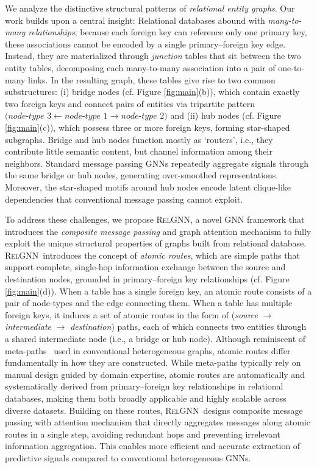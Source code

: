 \documentclass{article}
\newcommand{\method}{\textsc{RelGNN}}
\theoremstyle{plain}
\theoremstyle{definition}
\theoremstyle{remark}
\begin{document}
\vspace{-9pt}
 We analyze the distinctive structural patterns of \emph{relational entity graphs}. Our work builds upon a central insight: Relational databases abound with \textit{many-to-many relationships}; because each foreign key can reference only one primary key, these associations cannot be encoded by a single primary–foreign key edge. Instead, they are materialized through \emph{junction} tables that sit between the two entity tables, decomposing each many-to-many association into a pair of one-to-many links. In the resulting graph, these tables give rise to two common substructures: (i) bridge nodes (cf. Figure \ref{fig:main}(b)), which contain exactly two foreign keys and connect pairs of entities via tripartite pattern \(\textit{(node-type 3} \leftarrow \textit{node-type 1} \rightarrow \textit{node-type 2)}\) and (ii) hub nodes (cf. Figure \ref{fig:main}(c)), which possess three or more foreign keys, forming star-shaped subgraphs. Bridge and hub nodes function mostly as `routers', i.e., they contribute little semantic content, but channel information among their neighbors. Standard message passing GNNs repeatedly aggregate signals through the same bridge or hub nodes, generating over-smoothed representations. Moreover, the star-shaped motifs around hub nodes encode latent clique-like dependencies that conventional message passing cannot exploit.

To address these challenges, we propose \method, a novel GNN framework that introduces the \textit{composite message passing} and {graph attention mechanism} to fully exploit the unique structural properties of graphs built from relational database. \method~introduces the concept of \textit{atomic routes}, which are simple paths that support complete, single-hop information exchange between the source and destination nodes, grounded in primary–foreign key relationships (cf. Figure \ref{fig:main}(d)). When a table has a single foreign key, an atomic route consists of a pair of node-types and the edge connecting them. When a table has multiple foreign keys, it induces a set of atomic routes in the form of (\textit{source} $\rightarrow$ \textit{intermediate} $\rightarrow$ \textit{destination}) paths, each of which connects two entities through a shared intermediate node (i.e., a bridge or hub node). Although reminiscent of meta-paths~\citep{sun2011pathsim} used in conventional heterogeneous graphs, atomic routes differ fundamentally in how they are constructed. While meta-paths typically rely on manual design guided by domain expertise, atomic routes are automatically and systematically derived from primary–foreign key relationships in relational databases, making them both broadly applicable and highly scalable across diverse datasets. Building on these routes, \method~designs composite message passing with attention mechanism that directly aggregates messages along atomic routes in a single step, avoiding redundant hops and preventing irrelevant information aggregation. This enables more efficient and accurate extraction of predictive signals compared to conventional heterogeneous GNNs.
\end{document}
